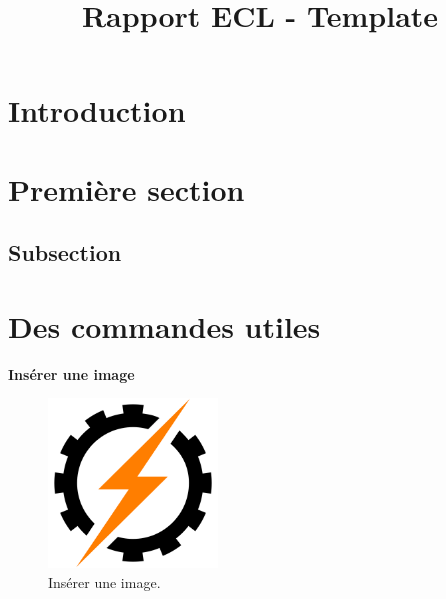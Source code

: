 \documentclass{rapportECL}
\title{Rapport ECL - Template} %
\begin{document}





\fairemarges %
\fairepagedegarde %
\tabledematieres %


\section*{Introduction}

\section{Première section}

\subsection{Subsection}


\section{Des commandes utiles}

\textbf{Insérer une image}
\begin{figure}[H]
  \centering
  \includegraphics[width=0.4\textwidth]{images/ECLAIR.png}
  \caption{Insérer une image.}
  \label{fig:logo}
\end{figure}
\end{document}
